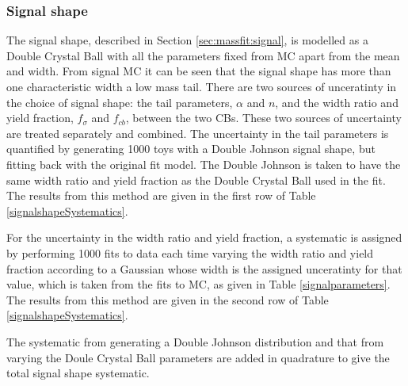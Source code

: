 \subsubsection{Signal shape}
\label{sec:systematics:signal}

The signal shape, described in Section \ref{sec:massfit:signal}, is modelled as a Double Crystal Ball with all the parameters fixed from MC apart from the mean and width. From signal MC it can be seen that the signal shape has more than one characteristic width a low mass tail. There are two sources of unceratinty in the choice of signal shape: the tail parameters, $\alpha$ and $n$, and the width ratio and yield fraction, $f_{\sigma}$ and $f_{cb}$, between the two CBs. These two sources of uncertainty are treated separately and combined. The uncertainty in the tail parameters is quantified by generating 1000 toys with a Double Johnson signal shape, but fitting back with the original fit model. The Double Johnson is taken to have the same width ratio and yield fraction as the Double Crystal Ball used in the \CP fit. The results from this method are given in the first row of Table \ref{signalshapeSystematics}.

For the uncertainty in the width ratio and yield fraction, a systematic is assigned by performing 1000 fits to data each time varying the width ratio and yield fraction according to a Gaussian whose width is the assigned unceratinty for that value, which is taken from the fits to MC, as given in Table \ref{signalparameters}. The results from this method are given in the second row of Table \ref{signalshapeSystematics}.

The systematic from generating a Double Johnson distribution and that from varying the Doule Crystal Ball parameters are added in quadrature to give the total signal shape systematic.

